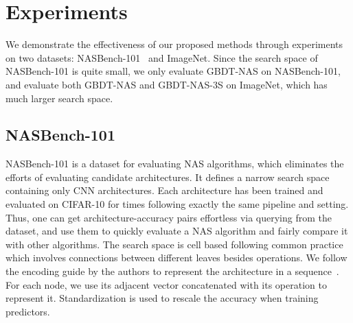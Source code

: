 \documentclass{article}
\begin{document}
\section{Experiments}
We demonstrate the effectiveness of our proposed methods through experiments on two datasets: NASBench-101~\cite{nasbench101} and ImageNet. Since the search space of NASBench-101 is quite small, we only evaluate GBDT-NAS on NASBench-101, and evaluate both GBDT-NAS and GBDT-NAS-3S on ImageNet, which has much larger search space.

\subsection{NASBench-101}
NASBench-101 is a dataset for evaluating NAS algorithms, which eliminates the efforts of evaluating candidate architectures. It defines a narrow search space containing only  CNN architectures. Each architecture has been trained and evaluated on CIFAR-10 for  times following exactly the same pipeline and setting. Thus, one can get architecture-accuracy pairs effortless via querying from the dataset, and use them to quickly evaluate a NAS algorithm and fairly compare it with other algorithms. The search space is cell based following common practice~\cite{nasnet,enas,darts} which involves connections between different leaves besides operations. We follow the encoding guide by the authors to represent the architecture in a sequence~\cite{nasbench101}. For each node, we use its adjacent vector concatenated with its operation to represent it. Standardization is used to rescale the accuracy when training predictors.
\end{document}
